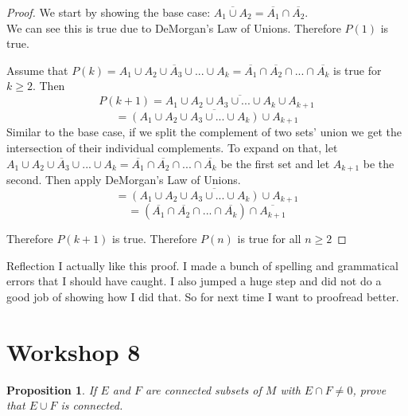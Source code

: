 \documentclass{article}
\newtheorem{prop}{Proposition}
\begin{document}
\begin{proof}
We start by showing the base case: $\overline{A_{1}\cup A_{2}}=\overline{A_{1}}\cap \overline{A_{2}}$.\\
We can see this is true due to DeMorgan's Law of Unions. Therefore $P(1)$ is true.

\vspace{5mm}

Assume that $P(k)=\overline{A_{1}\cup A_{2}\cup A_{3}\cup ...\cup A_{k}}=\overline{A_{1}}\cap \overline{A_{2}}\cap ...\cap \overline{A_{k}}$ is true for $k\geq 2$. Then $$P(k+1)=\overline{A_{1}\cup A_{2}\cup A_{3}\cup ...\cup A_{k}\cup A_{k+1}}$$
$$=\overline{(A_{1}\cup A_{2}\cup A_{3}\cup ...\cup A_{k})\cup A_{k+1}}$$
Similar to the base case, if we split the complement of two sets' union we get the intersection of their individual complements. To expand on that, let $\overline{A_{1}\cup A_{2}\cup A_{3}\cup ...\cup A_{k}}=\overline{A_{1}}\cap \overline{A_{2}}\cap ...\cap \overline{A_{k}}$ be the first set and let $A_{k+1}$ be the second. Then apply DeMorgan's Law of Unions.
$$=\overline{(A_{1}\cup A_{2}\cup A_{3}\cup ...\cup A_{k})\cup A_{k+1}}$$ 
$$=(\overline{A_{1}}\cap \overline{A_{2}}\cap ...\cap \overline{A_{k}})\cap \overline{A_{k+1}}$$

Therefore $P(k+1)$ is true.
Therefore $P(n)$ is true for all $n\geq 2$
\end{proof}

\begin{subsection}{Reflection}
I actually like this proof. I made a bunch of spelling and grammatical errors that I should have caught. I also jumped a huge step and did not do a good job of showing how I did that. So for next time I want to proofread better.
\end{subsection}

\section{Workshop 8}

\begin{prop}
If $E$ and $F$ are connected subsets of $M$ with $E \cap F \neq 0$, prove that $E\cup F$ is connected.
\end{prop}
\end{document}
